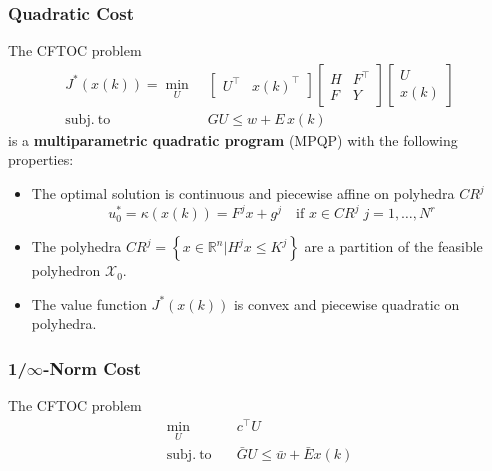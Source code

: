 \subsubsection{Quadratic Cost}
The CFTOC problem
\begin{align*}
    J^*(x(k)) = \min_U \; & \begin{bmatrix}
                                U^\top & {x(k)}^\top
                            \end{bmatrix}\begin{bmatrix}
                                             H & F^\top \\
                                             F & Y
                                         \end{bmatrix}\begin{bmatrix}
                                                          U \\ {x(k)}
                                                      \end{bmatrix} \\
    \mathrm{subj.\ to}\;  & GU\leq w+E\, x(k)
\end{align*}
is a \textbf{multiparametric quadratic program} (MPQP) with the following properties:
\begin{itemize}
    \item The optimal solution is continuous and piecewise affine on polyhedra $CR^j$
          \begin{equation*}
              u_0^* = \kappa(x(k)) = F^j x + g^j \quad \text{if } x\in CR^j\; j=1,\ldots, N^r
          \end{equation*}
    \item The polyhedra $CR^j = \left\{ x\in \mathbb{R}^n \Big| H^j x \leq K^j \right\}$ are a partition of the feasible polyhedron $\mathcal{X}_0$.
    \item The value function $J^*(x(k))$ is convex and piecewise quadratic on polyhedra.
\end{itemize}


\subsubsection[1/inf-Norm Cost]{1/$\infty$-Norm Cost}
The CFTOC problem
\begin{align*}
    \min_U \quad            & c^\top U                              \\
    \mathrm{subj.\ to}\quad & \bar{G} U \leq \bar{w} + \bar{E} x(k) \\
\end{align*}

